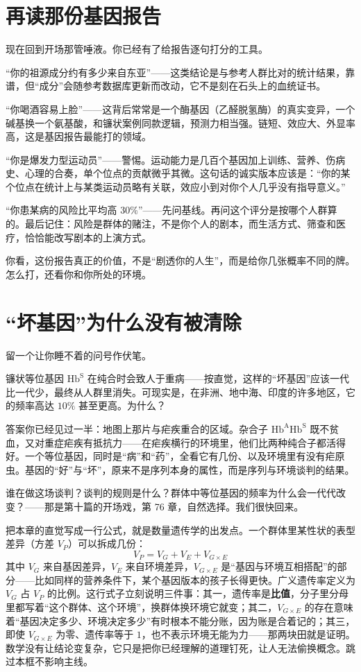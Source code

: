 \section{再读那份基因报告}

现在回到开场那管唾液。你已经有了给报告逐句打分的工具。

“你的祖源成分约有多少来自东亚”——这类结论是与参考人群比对的统计结果，靠谱，但“成分”会随参考数据库更新而改动，它不是刻在石头上的血统证书。

“你喝酒容易上脸”——这背后常常是一个酶基因（乙醛脱氢酶）的真实变异，一个碱基换一个氨基酸，和镰状案例同款逻辑，预测力相当强。链短、效应大、外显率高，这是基因报告最能打的领域。

“你是爆发力型运动员”——警惕。运动能力是几百个基因加上训练、营养、伤病史、心理的合奏，单个位点的贡献微乎其微。这句话的诚实版本应该是：“你的某个位点在统计上与某类运动员略有关联，效应小到对你个人几乎没有指导意义。”

“你患某病的风险比平均高 $30\%$”——先问基线。再问这个评分是按哪个人群算的。最后记住：风险是群体的赌注，不是你个人的剧本，而生活方式、筛查和医疗，恰恰能改写剧本的上演方式。

你看，这份报告真正的价值，不是“剧透你的人生”，而是给你几张概率不同的牌。怎么打，还看你和你所处的环境。

\section{“坏基因”为什么没有被清除}

留一个让你睡不着的问号作伏笔。

镰状等位基因 $\mathrm{Hb^{S}}$ 在纯合时会致人于重病——按直觉，这样的“坏基因”应该一代比一代少，最终从人群里消失。可现实是，在非洲、地中海、印度的许多地区，它的频率高达 $10\%$ 甚至更高。为什么？

答案你已经见过一半：地图上那片与疟疾重合的区域。杂合子 $\mathrm{Hb^{A}Hb^{S}}$ 既不贫血，又对重症疟疾有抵抗力——在疟疾横行的环境里，他们比两种纯合子都活得好。一个等位基因，同时是“病”和“药”，全看它有几份、以及环境里有没有疟原虫。基因的“好”与“坏”，原来不是序列本身的属性，而是序列与环境谈判的结果。

谁在做这场谈判？谈判的规则是什么？群体中等位基因的频率为什么会一代代改变？——那是第十篇的开场戏，第 76 章，自然选择。我们很快回来。

\begin{tiaozhan}
把本章的直觉写成一行公式，就是数量遗传学的出发点。一个群体里某性状的表型差异（方差 $V_P$）可以拆成几份：
\[V_P = V_G + V_E + V_{G\times E}\]
其中 $V_G$ 来自基因差异，$V_E$ 来自环境差异，$V_{G\times E}$ 是“基因与环境互相搭配”的部分——比如同样的营养条件下，某个基因版本的孩子长得更快。广义遗传率定义为 $V_G$ 占 $V_P$ 的比例。这行式子立刻说明三件事：其一，遗传率是\textbf{比值}，分子里分母里都写着“这个群体、这个环境”，换群体换环境它就变；其二，$V_{G\times E}$ 的存在意味着“基因决定多少、环境决定多少”有时根本不能分账，因为账是合着记的；其三，即使 $V_{G\times E}$ 为零、遗传率等于 $1$，也不表示环境无能为力——那两块田就是证明。数学没有让结论变复杂，它只是把你已经理解的道理钉死，让人无法偷换概念。跳过本框不影响主线。
\end{tiaozhan}


